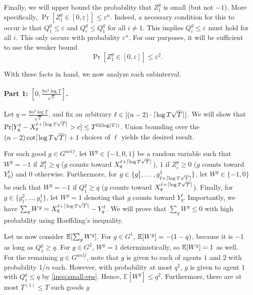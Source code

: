 Finally, we will upper bound the probability that $Z^g_1$ is small (but not $-1$). More specifically, $\Pr[Z^g_1 \in [0, \varepsilon]] \le \varepsilon^n$. Indeed, a necessary condition for this to occur is that $Q^g_1 \le \varepsilon$ and $Q^g_i \le Q^g_1$ for all $i \ne 1$. This implies $Q^g_i \le \varepsilon$ must hold for all $i$. This only occurs with probability $\varepsilon^n$. For our purposes, it will be sufficient to use the weaker bound
\begin{equation}\label{ineq:small-eps}
    \Pr[Z^g_1 \in [0, \varepsilon]] \le \varepsilon^2.
\end{equation}

With these facts in hand, we now analyze each subinterval.

\paragraph{Part 1: $\left[0, \frac{8n^2\log T}{\sqrt{T}}\right]$.} Let $q = \frac{8n^2\log T}{\sqrt{T}}$, and fix an arbitrary $\ell \in [(n - 2) \cdot \lceil\log T \sqrt{T}\rceil]$. We will show that $\Pr[Y^\ell_q - X_q^{\ell + \lceil\log T \sqrt{T}\rceil}  > c] \le T^{\Omega(\log(T))}$. Union bounding over the $(n - 2) \cot \lceil\log T \sqrt{T}\rceil + 1$ choices of $\ell$ yields the desired result.

For each good $g \in G^{welf}$, let $W^g \in \{-1, 0, 1\}$ be a random variable such that $W^g = -1$ if $Z^g_1 \ge q$ ($g$ counts toward $X_q^{\ell + \lceil\log T \sqrt{T}\rceil}$), $1$ if $Z^g_i \ge 0$ ($g$ counts toward $Y^\ell_0$) and $0$ otherwise. Furthermore, for $g \in \{g^1_1, \ldots, g^1_{\ell + \lceil\log T \sqrt{T}\rceil}\}$, let $W^g \in \{-1, 0\}$ be such that $W^g = -1$ if $Q^g_1 \ge q$ ($g$ counts toward $X_q^{\ell + \lceil\log T \sqrt{T}\rceil}$). Finally, for $g \in \{g^2_1, \ldots, g^1_{\ell}\}$, let $W^g = 1$ denoting that $g$ counts toward $Y_q^{\ell}$. Importantly, we have $\sum_g W^g = X_q^{\ell + \lceil\log T \sqrt{T}\rceil} - Y^\ell_q$. We will prove that $\sum_g W^g \le 0$ with high probability using Hoeffding's inequality. 

Let us now consider $\operatorname*{\mathbb{E}}[\sum_g W^g]$. For $g \in G^1$, $\operatorname*{\mathbb{E}}[W^g] = - (1 - q)$, because it is $-1$ as long as $Q^g_1 \ge q$. For $g \in G^2$, $W^g = 1$ deterministically, so $\operatorname*{\mathbb{E}}[W^g] = 1$ as well. For the remaining $g \in G^{welf}$, note that $g$ is given to each of agents $1$ and $2$ with probability $1/n$ each. However, with probability at most $q^2$, $g$ is given to agent $1$ with $Q^g_1 \le q$ by \eqref{ineq:small-eps}. Hence, $\mathbb{E}[W^g] \le q^2$. Furthermore, there are at most $T^{(1)} \le T$ such goods $g$

